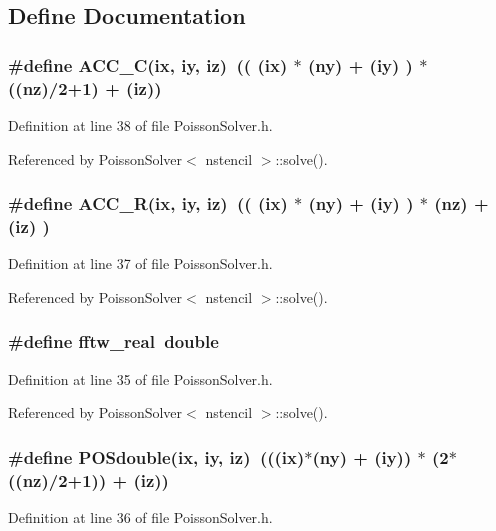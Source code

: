 \subsection{Define Documentation}
\subsubsection[{ACC\_\-C}]{\setlength{\rightskip}{0pt plus 5cm}\#define ACC\_\-C(ix, \/  iy, \/  iz)~(( (ix) $\ast$ (ny) + (iy) ) $\ast$ ((nz)/2+1) + (iz))}\label{PoissonSolver_8h_aa0ec3c1fa56accaf6945ccf59d19ec4a}


Definition at line 38 of file PoissonSolver.h.



Referenced by PoissonSolver$<$ nstencil $>$::solve().

\subsubsection[{ACC\_\-R}]{\setlength{\rightskip}{0pt plus 5cm}\#define ACC\_\-R(ix, \/  iy, \/  iz)~(( (ix) $\ast$ (ny) + (iy) ) $\ast$ (nz) + (iz) )}\label{PoissonSolver_8h_a2893f2854bb6eb4f81510181ef7da98d}


Definition at line 37 of file PoissonSolver.h.



Referenced by PoissonSolver$<$ nstencil $>$::solve().

\subsubsection[{fftw\_\-real}]{\setlength{\rightskip}{0pt plus 5cm}\#define fftw\_\-real~double}\label{PoissonSolver_8h_a5829f775aff7b5e2c04c4ec77020f4ac}


Definition at line 35 of file PoissonSolver.h.



Referenced by PoissonSolver$<$ nstencil $>$::solve().

\subsubsection[{POSdouble}]{\setlength{\rightskip}{0pt plus 5cm}\#define POSdouble(ix, \/  iy, \/  iz)~(((ix)$\ast$(ny) + (iy)) $\ast$ (2$\ast$((nz)/2+1)) + (iz))}\label{PoissonSolver_8h_a57c2f618d21bf58344c3d10ce4eb0425}


Definition at line 36 of file PoissonSolver.h.

